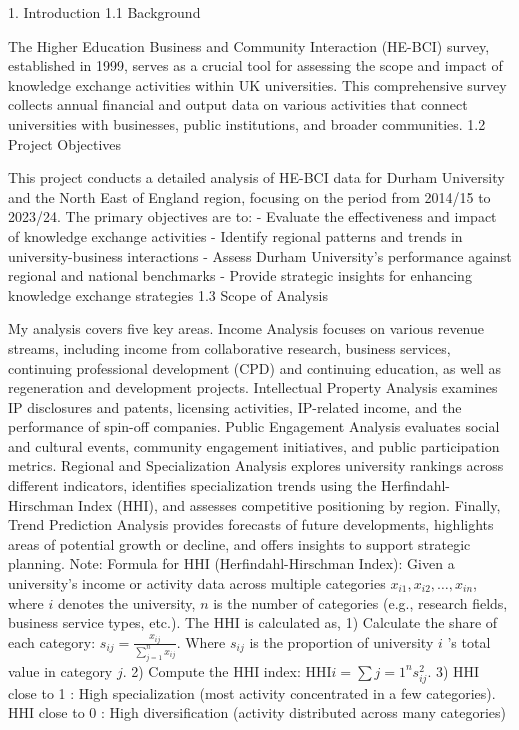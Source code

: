 1. Introduction
1.1 Background

The Higher Education Business and Community Interaction (HE-BCI) survey, established in 1999, serves as a crucial tool for assessing the scope and impact of knowledge exchange activities within UK universities. This comprehensive survey collects annual financial and output data on various activities that connect universities with businesses, public institutions, and broader communities.
1.2 Project Objectives

This project conducts a detailed analysis of HE-BCI data for Durham University and the North East of England region, focusing on the period from 2014/15 to 2023/24. The primary objectives are to:
- Evaluate the effectiveness and impact of knowledge exchange activities
- Identify regional patterns and trends in university-business interactions
- Assess Durham University's performance against regional and national benchmarks
- Provide strategic insights for enhancing knowledge exchange strategies
1.3 Scope of Analysis

My analysis covers five key areas. Income Analysis focuses on various revenue streams, including income from collaborative research, business services, continuing professional development (CPD) and continuing education, as well as regeneration and development projects. Intellectual Property Analysis examines IP disclosures and patents, licensing activities, IP-related income, and the performance of spin-off companies. Public Engagement Analysis evaluates social and cultural events, community engagement initiatives, and public participation metrics. Regional and Specialization Analysis explores university rankings across different indicators, identifies specialization trends using the Herfindahl-Hirschman Index (HHI), and assesses competitive positioning by region. Finally, Trend Prediction Analysis provides forecasts of future developments, highlights areas of potential growth or decline, and offers insights to support strategic planning.
Note: Formula for HHI (Herfindahl-Hirschman Index): Given a university's income or activity data across multiple categories $x_{i 1}, x_{i 2}, \ldots, x_{i n}$, where $i$ denotes the university, $n$ is the number of categories (e.g., research fields, business service types, etc.). The HHI is calculated as,
1) Calculate the share of each category: $s_{i j}=\frac{x_{i j}}{\sum_{j=1}^n x_{i j}}$. Where $s_{i j}$ is the proportion of university $i$ 's total value in category $j$.
2) Compute the HHI index: $\mathrm{HHI} i=\sum j=1^n s_{i j}^2$.
3) HHI close to 1 : High specialization (most activity concentrated in a few categories). HHI close to 0 : High diversification (activity distributed across many categories)


